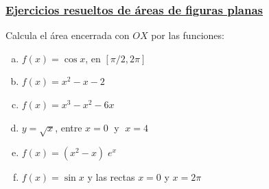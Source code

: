 \subsubsection{\underline{Ejercicios resueltos de áreas de figuras planas}}
\begin{ejre}
Calcula el área encerrada con $OX$ por las funciones:

\begin{multicols}{2}
\begin{enumerate}[a) ]
\item $f(x)=\cos x$, en $[\pi/2,2\pi]$
\item $f(x)=x^2-x-2$
\item $f(x)=x^3-x^2-6x$
\item $y=\sqrt{x}$,  entre $x=0\; $ y $\; x=4$
\item $f(x)=(x^2-x)\; e^x$
\item $f(x)=\sin x$ y las rectas $x=0$ y $x=2\pi$
\end{enumerate}	
\end{multicols}

\end{ejre}

